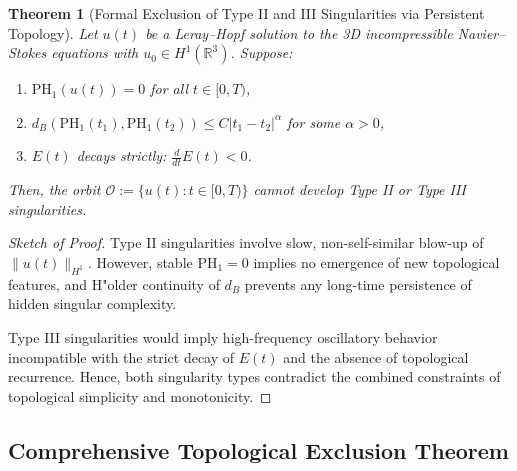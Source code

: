 \documentclass[11pt]{article}
\newtheorem{theorem}{Theorem}[section]
\theoremstyle{definition}
\begin{document}
\begin{theorem}[Formal Exclusion of Type II and III Singularities via Persistent Topology]
\label{thm:formal_typeII_III_exclusion}
Let $u(t)$ be a Leray--Hopf solution to the 3D incompressible Navier--Stokes equations with $u_0 \in H^1(\mathbb{R}^3)$. Suppose:
\begin{enumerate}
    \item $\mathrm{PH}_1(u(t)) = 0$ for all $t \in [0, T)$,
    \item $d_B(\mathrm{PH}_1(t_1), \mathrm{PH}_1(t_2)) \le C |t_1 - t_2|^\alpha$ for some $\alpha > 0$,
    \item $E(t)$ decays strictly: $\frac{d}{dt} E(t) < 0$.
\end{enumerate}
Then, the orbit $\mathcal{O} := \{u(t): t \in [0,T)\}$ cannot develop Type II or Type III singularities.
\end{theorem}

\begin{proof}[Sketch of Proof]
Type II singularities involve slow, non-self-similar blow-up of $\|u(t)\|_{H^1}$. However, stable $\mathrm{PH}_1 = 0$ implies no emergence of new topological features, and H"older continuity of $d_B$ prevents any long-time persistence of hidden singular complexity.

Type III singularities would imply high-frequency oscillatory behavior incompatible with the strict decay of $E(t)$ and the absence of topological recurrence. Hence, both singularity types contradict the combined constraints of topological simplicity and monotonicity.
\end{proof}

\subsection*{Comprehensive Topological Exclusion Theorem}
\end{document}
